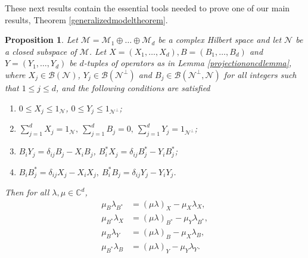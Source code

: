 \documentclass[11pt, reqno]{amsart}
\newtheorem{proposition}[theorem]{Proposition}
\newcommand\1{\boldsymbol {1}}
\numberwithin{equation}{section}
\begin{document}
These next results contain the essential tools needed to prove one of our main results, Theorem \ref{generalizedmodeltheorem}.

\begin{proposition}\label{mulambdaidentitiesforgeneralizedmodels}
Let $\mathcal{M} = \mathcal{M}_{1}\oplus \hdots \oplus \mathcal{M}_{d}$ be a complex Hilbert space and let $\mathcal{N}$ be a closed subspace of $\mathcal{M}$.  Let $X=(X_{1},\hdots, X_{d}), B=(B_{1},\hdots, B_{d})$ and $ Y=(Y_{1},\hdots, Y_{d})$ be  $d$-tuples of operators as in Lemma \ref{projectiononcdlemma}, where $X_{j}\in \mathcal{B}(\mathcal{N})$, $Y_{j} \in \mathcal{B}(\mathcal{N}^{\perp})$ and $B_{j} \in \mathcal{B}(\mathcal{N}^{\perp},\mathcal{N})$ for all integers such that $1\leq j \leq d$, and the following conditions are satisfied
\begin{enumerate}
  \item  $0 \leq X_{j} \leq 1_{\mathcal{N}}$, $ 0 \leq Y_{j} \leq 1_{\mathcal{N}^{\perp}}$;
  \item $\sum_{j=1}^{d} X_{j} = 1_{\mathcal{N}},~\sum_{j=1}^{d} B_{j} = 0, ~ \sum_{j=1}^{d} Y_{j} = 1_{\mathcal{N}^{\perp}}$;
  \item $B_{i}Y_{j} =  \delta_{ij}B_{j}-X_{i}B_{j}$, $B_{i}^{*}X_{j} =  \delta_{ij}B_{j}^{*}-Y_{i}B_{j}^{*} $;
  \item $B_{i}B^{*}_{j} =  \delta_{ij}X_{j}-X_{i}X_{j}, ~B^{*}_{i}B_{j} =  \delta_{ij}Y_{j}-Y_{i}Y_{j}$.
\end{enumerate}
Then for all $\lambda, \mu \in \mathbb{C}^{d}$,
\begin{align*}
\mu_{B}\lambda_{B^{*}} & = (\mu\lambda)_{X} - \mu_{X}\lambda_{X},\\
\mu_{B^{*}}\lambda_{X} & = (\mu\lambda)_{B^{*}} - \mu_{Y}\lambda_{B^{*}},\\
\mu_{B}\lambda_{Y} & = (\mu\lambda)_{B} - \mu_{X}\lambda_{B},\\
\mu_{B^{*}}\lambda_{B}& = (\mu\lambda)_{Y} - \mu_{Y}\lambda_{Y}.
\end{align*}
\end{proposition}
\end{document}
